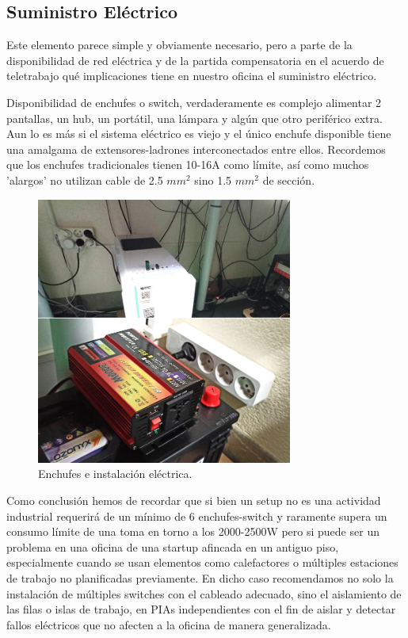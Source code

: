 \subsection{Suministro Eléctrico}
Este elemento parece simple y obviamente necesario, pero a parte de la disponibilidad de red eléctrica y de la partida compensatoria en el acuerdo de teletrabajo qué implicaciones tiene en nuestro oficina el suministro eléctrico.

Disponibilidad de enchufes o switch, verdaderamente es complejo alimentar 2 pantallas, un hub, un portátil, una lámpara y algún que otro periférico extra. Aun lo es más si el sistema eléctrico es viejo y el único enchufe disponible tiene una amalgama de extensores-ladrones interconectados entre ellos. Recordemos que los enchufes tradicionales tienen 10-16A como límite, así como muchos 'alargos' no utilizan cable de 2.5 $mm^{2}$ sino 1.5 $mm^{2}$ de sección.

\begin{figure}[!htb]
\begin{center}
\includegraphics[width=0.75\textwidth]{./figuras/instalacion_electrica.jpg}
\caption{ Enchufes e instalación eléctrica.}
\label{F:instalacion_electrica}
\end{center}
\end{figure}

Como conclusión hemos de recordar que si bien un setup no es una actividad industrial requerirá de un mínimo de 6 enchufes-switch y raramente supera un consumo límite de una toma en torno a los 2000-2500W pero si puede ser un problema en una oficina de una startup afincada en un antiguo piso, especialmente cuando se usan elementos como calefactores o múltiples estaciones de trabajo no planificadas previamente. En dicho caso recomendamos no solo la instalación de múltiples switches con el cableado adecuado, sino el aislamiento de las filas o islas de trabajo, en PIAs\cite{c_pia} independientes con el fin de aislar y detectar fallos eléctricos que no afecten a la oficina de manera generalizada.

